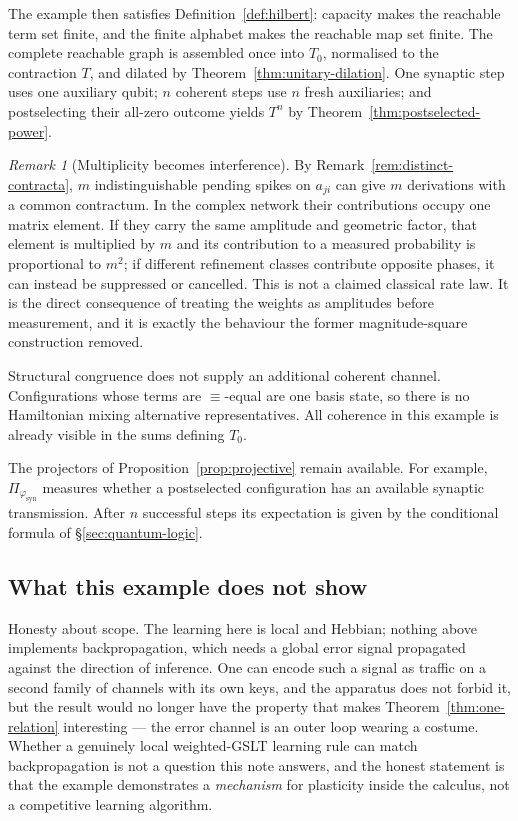 \documentclass[11pt,a4paper]{article}
\theoremstyle{plain}
\theoremstyle{definition}
\theoremstyle{remark}
\newtheorem{remark}[theorem]{Remark}
\begin{document}
The example then satisfies Definition~\ref{def:hilbert}: capacity makes the reachable term set
finite, and the finite alphabet makes the reachable map set finite. The complete reachable graph is
assembled once into $T_0$, normalised to the contraction $T$, and dilated by
Theorem~\ref{thm:unitary-dilation}. One synaptic step uses one auxiliary qubit; $n$ coherent steps
use $n$ fresh auxiliaries; and postselecting their all-zero outcome yields $T^n$ by
Theorem~\ref{thm:postselected-power}.

\begin{remark}[Multiplicity becomes interference]
\label{rem:bosonic}
By Remark~\ref{rem:distinct-contracta}, $m$ indistinguishable pending spikes on $a_{ji}$ can give
$m$ derivations with a common contractum. In the complex network their contributions occupy one
matrix element. If they carry the same amplitude and geometric factor, that element is multiplied by
$m$ and its contribution to a measured probability is proportional to $m^2$; if different
refinement classes contribute opposite phases, it can instead be suppressed or cancelled. This is
not a claimed classical rate law. It is the direct consequence of treating the weights as amplitudes
before measurement, and it is exactly the behaviour the former magnitude-square construction
removed.

Structural congruence does not supply an additional coherent channel. Configurations whose terms are
$\equiv$-equal are one basis state, so there is no Hamiltonian mixing alternative representatives.
All coherence in this example is already visible in the sums defining $T_0$.
\end{remark}

The projectors of Proposition~\ref{prop:projective} remain available. For example,
$\Pi_{\varphi_{\mathrm{syn}}}$ measures whether a postselected configuration has an available
synaptic transmission. After $n$ successful steps its expectation is given by the conditional formula
of \S\ref{sec:quantum-logic}.

\subsection{What this example does not show}

Honesty about scope. The learning here is local and Hebbian; nothing above implements
backpropagation, which needs a global error signal propagated against the direction of inference.
One can encode such a signal as traffic on a second family of channels with its own keys, and the
apparatus does not forbid it, but the result would no longer have the property that makes
Theorem~\ref{thm:one-relation} interesting --- the error channel is an outer loop wearing a costume.
Whether a genuinely local weighted-GSLT learning rule can match backpropagation is not a question
this note answers, and the honest statement is that the example demonstrates a \emph{mechanism} for
plasticity inside the calculus, not a competitive learning algorithm.
\end{document}

